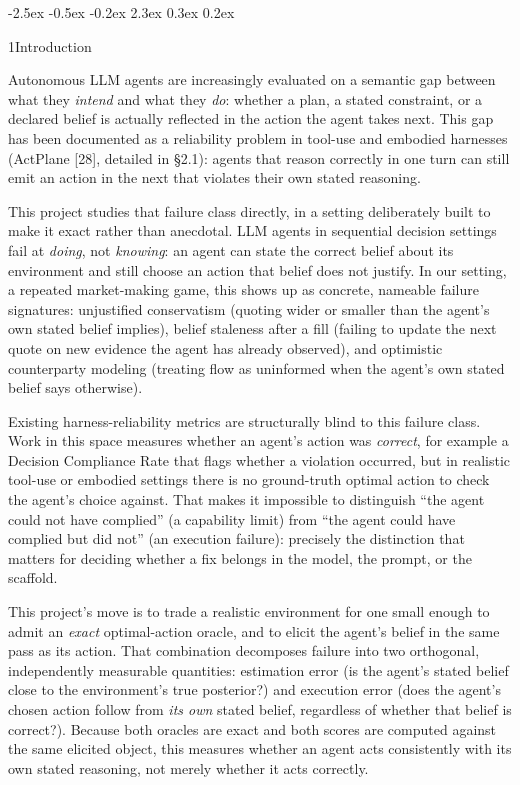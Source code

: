 \documentclass[
  11pt,
]{article}
\makeatletter
\renewcommand{\section}{%
  \@startsection{section}{1}{\z@}%
                {-2.5ex \@plus -0.5ex \@minus -0.2ex}%
                { 2.3ex \@plus  0.3ex \@minus  0.2ex}%
                {\large\bf\raggedright}%
}
\makeatother
\begin{document}
\section{1\quad Introduction}\label{introduction}

Autonomous LLM agents are increasingly evaluated on a semantic gap between what they \emph{intend} and what they \emph{do}: whether a plan, a stated constraint, or a declared belief is actually reflected in the action the agent takes next. This gap has been documented as a reliability problem in tool-use and embodied harnesses (ActPlane {[}28{]}, detailed in §2.1): agents that reason correctly in one turn can still emit an action in the next that violates their own stated reasoning.

This project studies that failure class directly, in a setting deliberately built to make it exact rather than anecdotal. LLM agents in sequential decision settings fail at \emph{doing}, not \emph{knowing}: an agent can state the correct belief about its environment and still choose an action that belief does not justify. In our setting, a repeated market-making game, this shows up as concrete, nameable failure signatures: unjustified conservatism (quoting wider or smaller than the agent's own stated belief implies), belief staleness after a fill (failing to update the next quote on new evidence the agent has already observed), and optimistic counterparty modeling (treating flow as uninformed when the agent's own stated belief says otherwise).

Existing harness-reliability metrics are structurally blind to this failure class. Work in this space measures whether an agent's action was \emph{correct}, for example a Decision Compliance Rate that flags whether a violation occurred, but in realistic tool-use or embodied settings there is no ground-truth optimal action to check the agent's choice against. That makes it impossible to distinguish ``the agent could not have complied'' (a capability limit) from ``the agent could have complied but did not'' (an execution failure): precisely the distinction that matters for deciding whether a fix belongs in the model, the prompt, or the scaffold.

This project's move is to trade a realistic environment for one small enough to admit an \emph{exact} optimal-action oracle, and to elicit the agent's belief in the same pass as its action. That combination decomposes failure into two orthogonal, independently measurable quantities: estimation error (is the agent's stated belief close to the environment's true posterior?) and execution error (does the agent's chosen action follow from \emph{its own} stated belief, regardless of whether that belief is correct?). Because both oracles are exact and both scores are computed against the same elicited object, this measures whether an agent acts consistently with its own stated reasoning, not merely whether it acts correctly.
\end{document}

